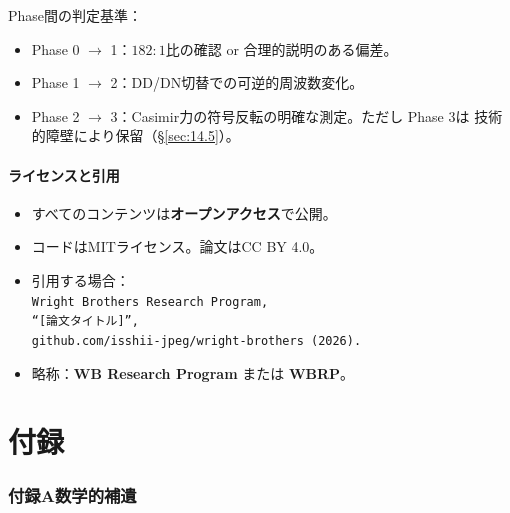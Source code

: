 \noindent
Phase間の判定基準：
\begin{itemize}
\item Phase 0 $\to$ 1：$182:1$比の確認 or 合理的説明のある偏差。
\item Phase 1 $\to$ 2：DD/DN切替での可逆的周波数変化。
\item Phase 2 $\to$ 3：Casimir力の符号反転の明確な測定。ただし Phase 3は
技術的障壁により保留（\S\ref{sec:14.5}）。
\end{itemize}


\subsection{ライセンスと引用}
\label{sec:16.5}

\begin{tcolorbox}[colback=green!5!white, colframe=green!60!black, title=ライセンスと引用]
\begin{itemize}
\item すべてのコンテンツは\textbf{オープンアクセス}で公開。
\item コードはMITライセンス。論文はCC BY 4.0。
\item 引用する場合：\\
\texttt{Wright Brothers Research Program, \\
``[論文タイトル]'', \\
github.com/isshii-jpeg/wright-brothers (2026).}
\item 略称：\textbf{WB Research Program} または \textbf{WBRP}。
\end{itemize}
\end{tcolorbox}



\newpage
\appendix
\part*{付録}



\section{付録A\quad 数学的補遺}
\label{app:math}

